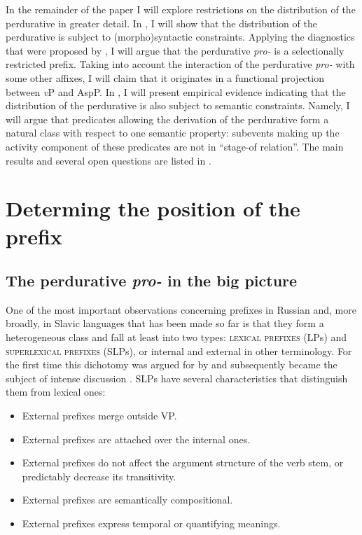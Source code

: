 \documentclass[output=paper,
]{langscibook}
\begin{document}
In the remainder of the paper I will explore restrictions on the distribution of the perdurative in greater detail. In , I will show that the distribution of the perdurative is subject to (morpho)syntactic constraints. Applying the diagnostics that were proposed by \citet{tatevosov2009mnozestvennaja,tatevosov2013mnozestvennaja}, I will argue that the perdurative \textit{pro-} is a selectionally restricted prefix. Taking into account the interaction of the perdurative \textit{pro-} with some other affixes, I will claim that it originates in a functional projection between \textit{v}P and AspP. In , I will present empirical evidence indicating that the distribution of the perdurative is also subject to semantic constraints. Namely, I will argue that predicates allowing the derivation of the perdurative form a natural class with respect to one semantic property: subevents making up the activity component of these predicates are not in  ``stage-of relation''. The main results and several open questions are listed in .


\section{Determing the position of the prefix} \label{sec:naumov:2}
\subsection{The perdurative \textit{pro-} in the big picture} \label{sec:naumov:2.1}
One of the most important observations concerning prefixes in Russian and, more broadly, in Slavic languages that has been made so far is that they form a heterogeneous class and fall at least into two types: \textsc{lexical prefixes} (LPs) and \textsc{superlexical prefixes} (SLPs), or internal and external in other terminology. For the first time this dichotomy was argued for by \citep{babko1999zero} and subsequently became the subject of intense discussion \citep[see, e.\,g.,][]{svenonius2004slavic, ramchand2005time, romanova2005superlexical, romanova2007constructing, tolskaya2015verbal}. SLPs have several characteristics that distinguish them from lexical ones:
\begin{itemize}
    \item External prefixes merge outside VP.
\item External prefixes are attached over the internal ones.
\item External prefixes do not affect the argument 	structure of the verb stem, or predictably decrease its transitivity.
\item External prefixes are semantically compositional.
\item External prefixes express temporal or quantifying meanings.
\end{itemize}
\end{document}
